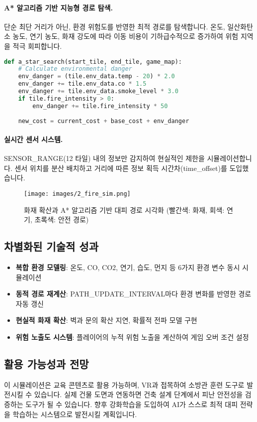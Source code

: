 \paragraph{A* 알고리즘 기반 지능형 경로 탐색.}
단순 최단 거리가 아닌, 환경 위험도를 반영한 최적 경로를 탐색합니다. 온도, 일산화탄소 농도, 연기 농도, 화재 강도에 따라 이동 비용이 기하급수적으로 증가하여 위험 지역을 적극 회피합니다.

\begin{lstlisting}[language=Python, basicstyle=\footnotesize\ttfamily]
def a_star_search(start_tile, end_tile, game_map):
    # Calculate environmental danger
    env_danger = (tile.env_data.temp - 20) * 2.0
    env_danger += tile.env_data.co * 1.5
    env_danger += tile.env_data.smoke_level * 3.0
    if tile.fire_intensity > 0:
        env_danger += tile.fire_intensity * 50
    
    new_cost = current_cost + base_cost + env_danger
\end{lstlisting}

\paragraph{실시간 센서 시스템.}
SENSOR\_RANGE(12 타일) 내의 정보만 감지하여 현실적인 제한을 시뮬레이션합니다. 센서 위치를 분산 배치하고 거리에 따른 정보 획득 시간차(time\_offset)를 도입했습니다.

\begin{figure}[H]
    \centering
    \texttt{[image: images/2\_fire\_sim.png]}
    \caption{화재 확산과 A* 알고리즘 기반 대피 경로 시각화 (빨간색: 화재, 회색: 연기, 초록색: 안전 경로)}
    \label{fig:fire_sim}
\end{figure}

\subsection{차별화된 기술적 성과}

\begin{itemize}[leftmargin=*]
    \item \textbf{복합 환경 모델링}: 온도, CO, CO2, 연기, 습도, 먼지 등 6가지 환경 변수 동시 시뮬레이션
    \item \textbf{동적 경로 재계산}: PATH\_UPDATE\_INTERVAL마다 환경 변화를 반영한 경로 자동 갱신
    \item \textbf{현실적 화재 확산}: 벽과 문의 확산 지연, 확률적 전파 모델 구현
    \item \textbf{위험 노출도 시스템}: 플레이어의 누적 위험 노출을 계산하여 게임 오버 조건 설정
\end{itemize}

\subsection{활용 가능성과 전망}

이 시뮬레이션은 교육 콘텐츠로 활용 가능하며, VR과 접목하여 소방관 훈련 도구로 발전시킬 수 있습니다. 실제 건물 도면과 연동하면 건축 설계 단계에서 피난 안전성을 검증하는 도구가 될 수 있습니다. 향후 강화학습을 도입하여 AI가 스스로 최적 대피 전략을 학습하는 시스템으로 발전시킬 계획입니다.
